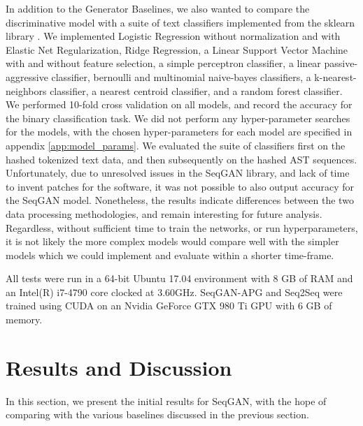 \documentclass[sigconf]{acmart}
\begin{document}
In addition to the Generator Baselines, we also wanted to compare the discriminative model with a suite of text classifiers implemented from the sklearn library \cite{pedregosa2011scikit}. We implemented Logistic Regression without normalization and with Elastic Net Regularization, Ridge Regression, a Linear Support Vector Machine with and without feature selection, a simple perceptron classifier, a linear passive-aggressive classifier, bernoulli and multinomial naive-bayes classifiers, a k-nearest-neighbors classifier, a nearest centroid classifier, and a random forest classifier. We performed 10-fold cross validation on all models, and record the accuracy for the binary classification task. We did not perform any hyper-parameter searches for the models, with the chosen hyper-parameters for each model are specified in appendix \ref{app:model_params}. We evaluated the suite of classifiers first on the hashed tokenized text data, and then subsequently on the hashed AST sequences. Unfortunately, due to unresolved issues in the SeqGAN library, and lack of time to invent patches for the software, it was not possible to also output accuracy for the SeqGAN model. Nonetheless, the results indicate differences between the two data processing methodologies, and remain interesting for future analysis. Regardless, without sufficient time to train the networks, or run hyperparameters, it is not likely the more complex models would compare well with the simpler models which we could implement and evaluate within a shorter time-frame.

All tests were run in a 64-bit Ubuntu 17.04 environment with 8 GB of RAM and an Intel(R) i7-4790 core clocked at 3.60GHz. SeqGAN-APG and Seq2Seq were trained using CUDA on an Nvidia GeForce GTX 980 Ti GPU with 6 GB of memory. 

\section{Results and Discussion}
\label{sec:results}
In this section, we present the initial results for SeqGAN, with the hope of comparing with the various baselines discussed in the previous section. %
\end{document}
